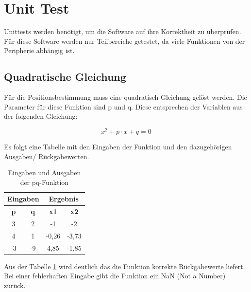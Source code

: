 \newpage
\section{Unit Test}

Unittests werden benötigt, um die Software auf ihre Korrektheit zu überprüfen. Für diese Software werden nur Teilbereiche getestet, da viele Funktionen von der Peripherie abhängig ist.

\subsection{Quadratische Gleichung}
Für die Positionsbestimmung muss eine quadratisch Gleichung gelöst werden. Die Parameter für diese Funktion sind \si{p} und \si{q}. Diese entsprechen der Variablen aus der folgenden Gleichung:

\begin{equation}
\label{eq:unit_test_pq_formel}
x^{2} + p \cdot x + q = 0
\end{equation}

Es folgt eine Tabelle mit den Eingaben der Funktion und den dazugehörigen Ausgaben/ Rückgabewerten. 

\begin{table}[H]
\centering
\caption{Eingaben und Ausgaben der pq-Funktion}
\label{table:pq_funktion}
\begin{tabular}{|c|c|c|c|}
\hline
\multicolumn{2}{|c|}{\textbf{Eingaben}} & \multicolumn{2}{c|}{\textbf{Ergebnis}} \\ \hline
\textbf{p}         & \textbf{q}         & \textbf{x1}        & \textbf{x2}       \\ \hline
3                  & 2                  & -1                 & -2                \\ \hline
4                  & 1                  & -0,26                   & -3,73                  \\ \hline
-3                 & -9                 & 4,85                   & -1,85                  \\ \hline
\end{tabular}
\end{table}

Aus der Tabelle \ref{table:pq_funktion} wird deutlich das die Funktion korrekte Rückgabewerte liefert. Bei einer fehlerhaften Eingabe gibt die Funktion ein \si{NaN} (Not a Number) zurück.


